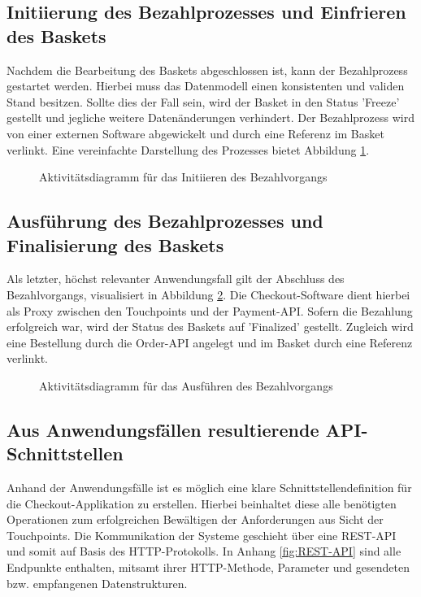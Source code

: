\subsection{Initiierung des Bezahlprozesses und Einfrieren des Baskets}

Nachdem die Bearbeitung des Baskets abgeschlossen ist, kann der Bezahlprozess gestartet werden. Hierbei muss das Datenmodell einen konsistenten und validen Stand besitzen. Sollte dies der Fall sein, wird der Basket in den Status 'Freeze' gestellt und jegliche weitere Datenänderungen verhindert. Der Bezahlprozess wird von einer externen Software abgewickelt und durch eine Referenz im Basket verlinkt. Eine vereinfachte Darstellung des Prozesses bietet Abbildung \ref{fig:SL-InitPayment}.

\begin{figure}[h!]
	\centering
	
	\caption{Aktivitätsdiagramm für das Initiieren des Bezahlvorgangs }
	\label{fig:SL-InitPayment}
\end{figure}

\subsection{Ausführung des Bezahlprozesses und Finalisierung des Baskets}

Als letzter, höchst relevanter Anwendungsfall gilt der Abschluss des Bezahlvorgangs, visualisiert in Abbildung \ref{fig:SL-ExecPayment}. Die Checkout-Software dient hierbei als Proxy zwischen den Touchpoints und der Payment-API. Sofern die Bezahlung erfolgreich war, wird der Status des Baskets auf 'Finalized' gestellt. Zugleich wird eine Bestellung durch die Order-API angelegt und im Basket durch eine Referenz verlinkt.

\begin{figure}[h!]
	\centering
	
	\caption{Aktivitätsdiagramm für das Ausführen des Bezahlvorgangs }
	\label{fig:SL-ExecPayment}
\end{figure}

\subsection{Aus Anwendungsfällen resultierende API-Schnittstellen }

Anhand der Anwendungsfälle ist es möglich eine klare Schnittstellendefinition für die Checkout-Applikation zu erstellen. Hierbei beinhaltet diese alle benötigten Operationen zum erfolgreichen Bewältigen der Anforderungen aus Sicht der Touchpoints. Die Kommunikation der Systeme geschieht über eine \acrshort{REST}-API und somit auf Basis des \acrshort{HTTP}-Protokolls. In Anhang \ref{fig:REST-API} sind alle Endpunkte enthalten, mitsamt ihrer HTTP-Methode, Parameter und gesendeten bzw. empfangenen Datenstrukturen.

